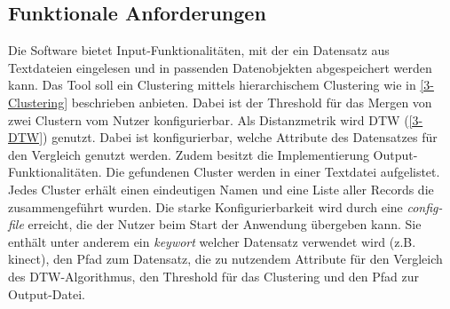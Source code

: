 \subsection{Funktionale Anforderungen}
\label{4-FunktionaleAnforderungen}
Die Software bietet Input-Funktionalitäten,
mit der ein Datensatz aus Textdateien eingelesen und in passenden Datenobjekten abgespeichert werden kann.
Das Tool soll ein Clustering mittels hierarchischem Clustering wie in \autoref{3-Clustering} beschrieben anbieten.
Dabei ist der Threshold für das Mergen von zwei Clustern vom Nutzer konfigurierbar.
Als Distanzmetrik wird \ac{DTW} (\autoref{3-DTW}) genutzt.
Dabei ist konfigurierbar, welche Attribute des Datensatzes für den Vergleich genutzt werden.
Zudem besitzt die Implementierung Output-Funktionalitäten.
Die gefundenen Cluster werden in einer Textdatei aufgelistet.
Jedes Cluster erhält einen eindeutigen Namen und eine Liste aller Records die zusammengeführt wurden.
Die starke Konfigurierbarkeit wird durch eine \emph{config-file} erreicht,
die der Nutzer beim Start der Anwendung übergeben kann.
Sie enthält unter anderem ein \emph{keywort} welcher Datensatz verwendet wird (z.B. \glqq kinect\grqq),
den Pfad zum Datensatz, die zu nutzendem Attribute für den Vergleich des \ac{DTW}-Algorithmus,
den Threshold für das Clustering und den Pfad zur Output-Datei.

